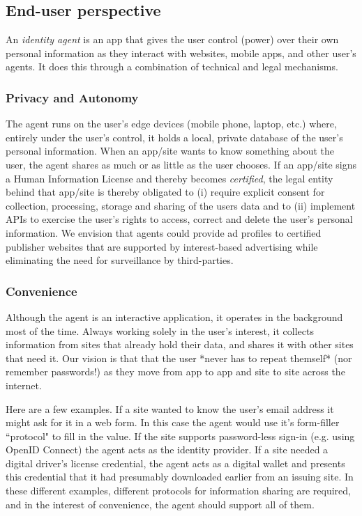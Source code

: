 \documentclass[11pt, oneside]{article}   	%
\begin{document}
\subsection{End-user perspective}
An \emph{identity agent} is an app that gives the user control (power) over their own personal information as they interact with websites, mobile apps, and other user's agents. It does this through a combination of technical and legal mechanisms.

\subsubsection{Privacy and Autonomy} 
The agent runs on the user's edge devices (mobile phone, laptop, etc.) where, entirely under the user's control, it holds a local, private database of the user's personal information. When an app/site wants to know something about the user, the agent shares as much or as little as the user chooses. If an app/site signs a Human Information License and thereby becomes \emph{certified}, the legal entity behind that app/site is thereby obligated to (i) require explicit consent for collection, processing, storage and sharing of the users data and to (ii) implement APIs to exercise the user's rights to access, correct and delete the user's personal information. We envision that agents could provide ad profiles to certified publisher websites that are supported by interest-based advertising while eliminating the need for surveillance by third-parties.

\subsubsection{Convenience}
Although the agent is an interactive application, it operates in the background most of the time. Always working solely in the user's interest, it collects information from sites that already hold their data, and shares it with other sites that need it. Our vision is that that the user *never has to repeat themself* (nor remember passwords!) as they move from app to app and site to site across the internet.

Here are a few examples. If a site wanted to know the user's email address it might ask for it in a web form. In this case the agent would use it's form-filler ``protocol" to fill in the value. If the site supports password-less sign-in (e.g. using OpenID Connect) the agent acts as the identity provider. If a site needed a digital driver's license credential, the agent acts as a digital wallet and presents this credential that it had presumably downloaded earlier from an issuing site. In these different examples, different protocols for information sharing are required, and in the interest of convenience, the agent should support all of them.
\end{document}
